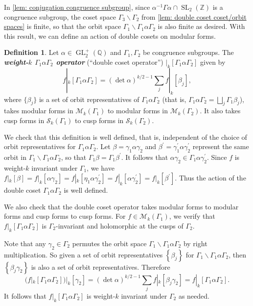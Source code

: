 \documentclass[10pt,leqno,twoside]{article}
\theoremstyle{plain}
\theoremstyle{definition}
\newtheorem{definition/}[lem]{Definition}
\newenvironment{definition}
  {\renewcommand{\qedsymbol}{\textdagger}%
   \pushQED{\qed}\begin{definition/}}
  {\popQED\end{definition/}}
\numberwithin{equation}{section}
\numberwithin{lem}{section}
\newcommand{\cbr}[1]{\left\{#1\right\}}
\newcommand{\textib}[1]{\textbf{\textit{#1\index{#1}}}} %
\DeclareMathOperator{\GL}{GL}
\DeclareMathOperator{\SL}{SL}
\newcommand{\slz}{\SL_2(\mathbb{Z})}
\newcommand{\glqp}{\GL_2^+(\mathbb{Q})}
\begin{document}
In \cref{lem: conjugation congruence subgroup}, since $\alpha^{-1}\varGamma\alpha\cap\slz$ is a congruence subgroup, the coset space $\varGamma_3\backslash \varGamma_2$ from \cref{lem: double coset coset/orbit spaces} is finite, so that the orbit space $\varGamma_1\backslash \varGamma_1\alpha\varGamma_2$ is also finite as desired. With this result, we can define an action of double cosets on modular forms.

\begin{definition}\label{def: weight k double coset operator}
    Let $\alpha\in \glqp$ and $\varGamma_1,\varGamma_2$ be congruence subgroups. The \textib{weight-$k$ $\varGamma_1\alpha\varGamma_2$ operator} (``double coset operator'') $|_k[\varGamma_1\alpha\varGamma_2]$ given by 
    \[f|_k[\varGamma_1\alpha\varGamma_2] = (\det \alpha)^{k/2-1}\sum_jf|_k[\beta_j],\] where $\{\beta_j\}$ is a set of orbit representatives of $\varGamma_1\alpha\varGamma_2$ (that is, $\varGamma_1\alpha\varGamma_2 = \bigsqcup_j \varGamma_1\beta_j$), takes modular forms in $\mathcal M_k(\varGamma_1)$ to modular forms in $\mathcal M_k(\varGamma_2)$. It also takes cusp forms in $\mathcal S_k(\varGamma_1)$ to cusp forms in $\mathcal S_k(\varGamma_2)$.
\end{definition}
We check that this definition is well defined, that is, independent of the choice of orbit representatives for $\varGamma_1\alpha\varGamma_2$. Let $\beta = \gamma_1\alpha\gamma_2$ and $\beta^\prime = \gamma_1^\prime\alpha\gamma_2^\prime$ represent the same orbit in $\varGamma_1\backslash\varGamma_1\alpha\varGamma_2$, so that $\varGamma_1\beta = \varGamma_1\beta^\prime$. It follows that $\alpha\gamma_2\in\varGamma_1\alpha\gamma_2^\prime$. Since $f$ is weight-$k$ invariant under $\varGamma_1$, we have $f|_k[\beta] = f|_k[\alpha\gamma_2] = f|_k[\eta_1\alpha\gamma_2^\prime] = f|_k[\alpha\gamma_2^\prime] = f|_k[\beta^\prime]$. Thus the action of the double coset $\varGamma_1\alpha\varGamma_2$ is well defined.

We also check that the double coset operator takes modular forms to modular forms and cusp forms to cusp forms. For $f\in \mathcal M_k(\varGamma_1)$, we verify that $f|_k[\varGamma_1\alpha\varGamma_2]$ is $\varGamma_2$-invariant and holomorphic at the cusps of $\varGamma_2$.

Note that any $\gamma_2\in\varGamma_2$ permutes the orbit space $\varGamma_1\backslash\varGamma_1\alpha\varGamma_2$ by right multiplication. So given a set of orbit representatives $\cbr{\beta_j}$ for $\varGamma_1\backslash\varGamma_1\alpha\varGamma_2$, then $\cbr{\beta_j\gamma_2}$ is also a set of orbit representatives. Therefore 
\[(f|_k[\varGamma_1\alpha\varGamma_2])|_k[\gamma_2] = (\det\alpha)^{k/2-1}\sum_j f|_k[\beta_j\gamma_2] = f|_k[\varGamma_1\alpha\varGamma_2].\] It follows that $f|_k[\varGamma_1\alpha\varGamma_2]$ is weight-$k$ invariant under $\varGamma_2$ as needed.
\end{document}
